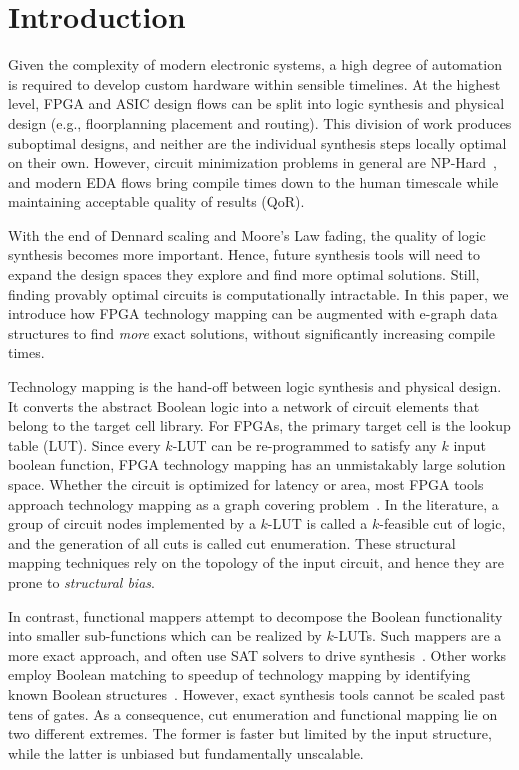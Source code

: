 \section{Introduction}\label{sec:intro}
Given the complexity of modern electronic systems, a high degree of automation
is required to develop custom hardware within sensible timelines. At the
highest level, FPGA and ASIC design flows can be split into logic synthesis and
physical design (e.g., floorplanning placement and routing). This division of
work produces suboptimal designs, and neither are the individual synthesis
steps locally optimal on their own. However, circuit minimization problems in
general are NP-Hard~\cite{logicmin,twolevellogic}, and modern EDA flows bring
compile times down to the human timescale while maintaining acceptable quality
of results (QoR).

With the end of Dennard scaling and Moore's Law fading, the quality of logic
synthesis becomes more important. Hence, future synthesis tools will need to
expand the design spaces they explore and find more optimal solutions. Still,
finding provably optimal circuits is computationally intractable. In this
paper, we introduce how FPGA technology mapping can be augmented with e-graph
data structures to find \textit{more} exact solutions, without significantly
increasing compile times.

Technology mapping is the hand-off between logic synthesis and physical design.
It converts the abstract Boolean logic into a network of circuit elements that
belong to the target cell library. For FPGAs, the primary target cell is the
lookup table (LUT). Since every $k$-LUT can be re-programmed to satisfy any $k$
input boolean function, FPGA technology mapping has an unmistakably large
solution space. Whether the circuit is optimized for latency or area, most FPGA
tools approach technology mapping as a graph covering problem~\cite{flowmap,
    daomap, attmap, imap}. In the literature, a group of circuit nodes implemented
by a $k$-LUT is called a $k$-feasible cut of logic, and the generation of all
cuts is called cut enumeration. These structural mapping techniques rely on the
topology of the input circuit, and hence they are prone to \textit{structural
    bias}.

In contrast, functional mappers attempt to decompose the Boolean functionality
into smaller sub-functions which can be realized by $k$-LUTs. Such mappers are
a more exact approach, and often use SAT solvers to drive
synthesis~\cite{satmap,satmap2}. Other works employ Boolean matching to speedup
of technology mapping by identifying known Boolean
structures~\cite{boolmatch,fastboolmatch}. However, exact synthesis tools
cannot be scaled past tens of gates. As a consequence, cut enumeration and
functional mapping lie on two different extremes. The former is faster but
limited by the input structure, while the latter is unbiased but fundamentally
unscalable.

